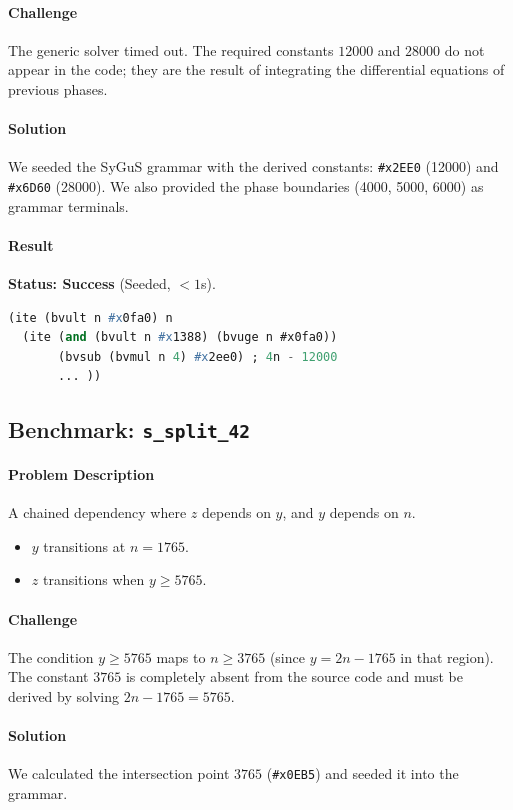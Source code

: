 \documentclass{article}
\begin{document}
\paragraph{Challenge}
The generic solver timed out. The required constants $12000$ and $28000$ do not appear in the code; they are the result of integrating the differential equations of previous phases.

\paragraph{Solution}
We seeded the SyGuS grammar with the derived constants: \texttt{\#x2EE0} (12000) and \texttt{\#x6D60} (28000). We also provided the phase boundaries (4000, 5000, 6000) as grammar terminals.

\paragraph{Result}
\textbf{Status: Success} (Seeded, $<1$s).
\begin{lstlisting}[language=Lisp]
(ite (bvult n #x0fa0) n 
  (ite (and (bvult n #x1388) (bvuge n #x0fa0)) 
       (bvsub (bvmul n 4) #x2ee0) ; 4n - 12000
       ... ))
\end{lstlisting}

\subsection{Benchmark: \texttt{s\_split\_42}}
\paragraph{Problem Description}
A chained dependency where $z$ depends on $y$, and $y$ depends on $n$.
\begin{itemize}
    \item $y$ transitions at $n=1765$.
    \item $z$ transitions when $y \ge 5765$.
\end{itemize}

\paragraph{Challenge}
The condition $y \ge 5765$ maps to $n \ge 3765$ (since $y = 2n - 1765$ in that region). The constant $3765$ is completely absent from the source code and must be derived by solving $2n - 1765 = 5765$.

\paragraph{Solution}
We calculated the intersection point $3765$ (\texttt{\#x0EB5}) and seeded it into the grammar.
\end{document}
